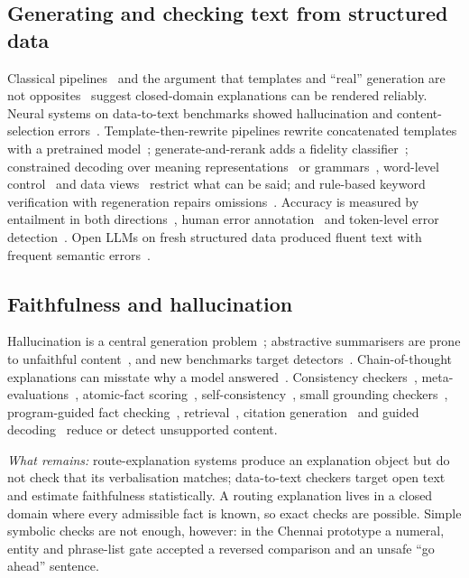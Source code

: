 \documentclass[journal]{IEEEtran}
\begin{document}
\subsection{Generating and checking text from structured data}
Classical pipelines~\cite{reiter1997nlg} and the argument that templates and ``real'' generation are not opposites~\cite{vandeemter2005template} suggest closed-domain explanations can be rendered reliably. Neural systems on data-to-text benchmarks showed hallucination and content-selection errors~\cite{dusek2020e2e,osuji2024d2t}. Template-then-rewrite pipelines rewrite concatenated templates with a pretrained model~\cite{kale2020t2g2}; generate-and-rerank adds a fidelity classifier~\cite{harkous2020datatuner}; constrained decoding over meaning representations~\cite{balakrishnan2019constrained} or grammars~\cite{geng2023gcd}, word-level control~\cite{rebuffel2022controlling} and data views~\cite{thomson2023views} restrict what can be said; and rule-based keyword verification with regeneration repairs omissions~\cite{ren2025vcp}. Accuracy is measured by entailment in both directions~\cite{dusek2020nli}, human error annotation~\cite{thomson2020gold} and token-level error detection~\cite{kasner2021textincontext}. Open LLMs on fresh structured data produced fluent text with frequent semantic errors~\cite{kasner2024quintd}.

\subsection{Faithfulness and hallucination}
Hallucination is a central generation problem~\cite{ji2023hallucination}; abstractive summarisers are prone to unfaithful content~\cite{maynez2020faithfulness}, and new benchmarks target detectors~\cite{bao2025faithbench}. Chain-of-thought explanations can misstate why a model answered~\cite{turpin2023unfaithful}. Consistency checkers~\cite{kryscinski2020factcc}, meta-evaluations~\cite{honovich2022true}, atomic-fact scoring~\cite{min2023factscore}, self-consistency~\cite{manakul2023selfcheck}, small grounding checkers~\cite{tang2024minicheck}, program-guided fact checking~\cite{pan2023programfc}, retrieval~\cite{lewis2020rag}, citation generation~\cite{gao2023alce} and guided decoding~\cite{willard2023guided} reduce or detect unsupported content.

\emph{What remains:} route-explanation systems produce an explanation object but do not check that its verbalisation matches; data-to-text checkers target open text and estimate faithfulness statistically. A routing explanation lives in a closed domain where every admissible fact is known, so exact checks are possible. Simple symbolic checks are not enough, however: in the Chennai prototype a numeral, entity and phrase-list gate accepted a reversed comparison and an unsafe ``go ahead'' sentence.
\end{document}
